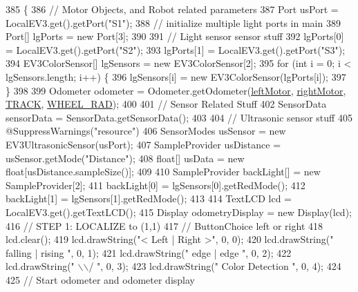 \begin{DoxyCode}
385                                                       \{
386     \textcolor{comment}{// Motor Objects, and Robot related parameters}
387     Port usPort = LocalEV3.get().getPort(\textcolor{stringliteral}{"S1"});
388     \textcolor{comment}{// initialize multiple light ports in main}
389     Port[] lgPorts = \textcolor{keyword}{new} Port[3];
390 
391     \textcolor{comment}{// Light sensor sensor stuff}
392     lgPorts[0] = LocalEV3.get().getPort(\textcolor{stringliteral}{"S2"});
393     lgPorts[1] = LocalEV3.get().getPort(\textcolor{stringliteral}{"S3"});
394     EV3ColorSensor[] lgSensors = \textcolor{keyword}{new} EV3ColorSensor[2];
395     \textcolor{keywordflow}{for} (\textcolor{keywordtype}{int} i = 0; i < lgSensors.length; i++) \{
396       lgSensors[i] = \textcolor{keyword}{new} EV3ColorSensor(lgPorts[i]);
397     \}
398 
399     Odometer odometer = Odometer.getOdometer(\hyperlink{enumca_1_1mcgill_1_1ecse211_1_1project_1_1_game_a7c673571bf50fdb6917a9d7bb671e003}{leftMotor}, \hyperlink{enumca_1_1mcgill_1_1ecse211_1_1project_1_1_game_a7a05fcf37c4435c32270776a427ba0d2}{rightMotor}, 
      \hyperlink{enumca_1_1mcgill_1_1ecse211_1_1project_1_1_game_a64cf12cdd6772ac1ce351ff1dfadd626}{TRACK}, \hyperlink{enumca_1_1mcgill_1_1ecse211_1_1project_1_1_game_a91bd64670c2a91d006c907142783b1f8}{WHEEL\_RAD});
400 
401     \textcolor{comment}{// Sensor Related Stuff}
402     SensorData sensorData = SensorData.getSensorData();
403 
404     \textcolor{comment}{// Ultrasonic sensor stuff}
405     @SuppressWarnings(\textcolor{stringliteral}{"resource"})
406     SensorModes usSensor = new EV3UltrasonicSensor(usPort);
407     SampleProvider usDistance = usSensor.getMode("Distance");
408     \textcolor{keywordtype}{float}[] usData = new \textcolor{keywordtype}{float}[usDistance.sampleSize()];
409 
410     SampleProvider backLight[] = new SampleProvider[2];
411     backLight[0] = lgSensors[0].getRedMode();
412     backLight[1] = lgSensors[1].getRedMode();
413 
414     TextLCD lcd = LocalEV3.get().getTextLCD();
415     Display odometryDisplay = new Display(lcd);
416     \textcolor{comment}{// STEP 1: LOCALIZE to (1,1)}
417     \textcolor{comment}{// ButtonChoice left or right}
418     lcd.clear();
419     lcd.drawString("<  Left  |  Right >", 0, 0);
420     lcd.drawString(" falling | rising  ", 0, 1);
421     lcd.drawString("  edge   |  edge   ", 0, 2);
422     lcd.drawString("        \(\backslash\)\(\backslash\)/        ", 0, 3);
423     lcd.drawString("  Color Detection  ", 0, 4);
424 
425     \textcolor{comment}{// Start odometer and odometer display}

\end{DoxyCode}

